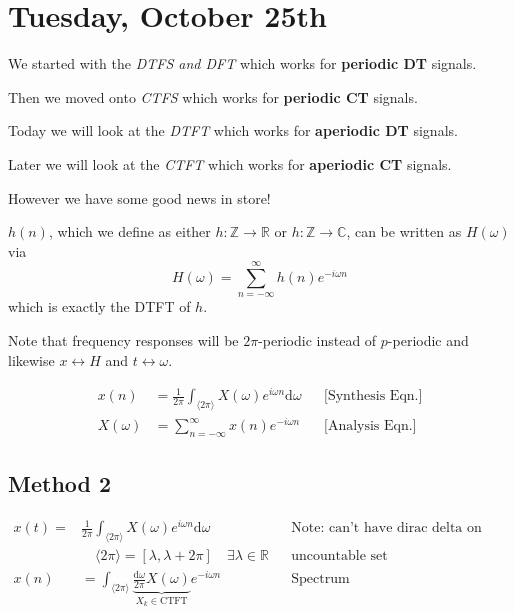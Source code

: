 \section{Tuesday, October 25th}
We started with the \textit{DTFS and DFT} which works for \textbf{periodic DT} signals.

Then we moved onto \textit{CTFS} which works for \textbf{periodic CT} signals.

Today we will look at the \textit{DTFT} which works for \textbf{aperiodic DT} signals.

Later we will look at the \textit{CTFT} which works for \textbf{aperiodic CT} signals.

\hrulefill

However we have some good news in store!

$h(n)$, which we define as either $h:\mathbb Z\to\mathbb R$ or $h:\mathbb Z\to\mathbb C$, can be written as $H(\omega)$ via \[H(\omega)=\sum_{n=-\infty}^\infty h(n)e^{-i\omega n}\]
which is exactly the DTFT of $h$.

Note that frequency responses will be $2\pi$-periodic instead of $p$-periodic and likewise $x\leftrightarrow H$ and $t\leftrightarrow \omega$.

\begin{align*}
    x(n) &= \frac1{2\pi}\int_{\langle2\pi\rangle} X(\omega) e^{i\omega n} \mathrm d \omega
    &&\text{[Synthesis Eqn.]}
    \\
    X(\omega) &= \sum_{n=-\infty}^\infty x(n) e^{-i\omega n}
    &&\text{[Analysis Eqn.]}
\end{align*}

\subsection{Method 2}
\begin{align*}
    x(t)=
    &\frac1{2\pi} \int_{\langle2\pi\rangle} X(\omega) e^{i\omega n} \mathrm d \omega
    &&\text{Note: can't have dirac delta on boundary}
    \\
    &\quad
    \langle2\pi\rangle
    =[\lambda,\lambda+2\pi]\quad\exists\lambda\in\mathbb R
    &&\text{uncountable set}
    \\
    x(n)
    &=\int_{\langle2\pi\rangle} \underbrace{\frac{\mathrm d \omega}{2\pi} X(\omega)}_{X_k \in \text{CTFT}} e^{-i\omega n}
    &&\text{Spectrum}
\end{align*}

